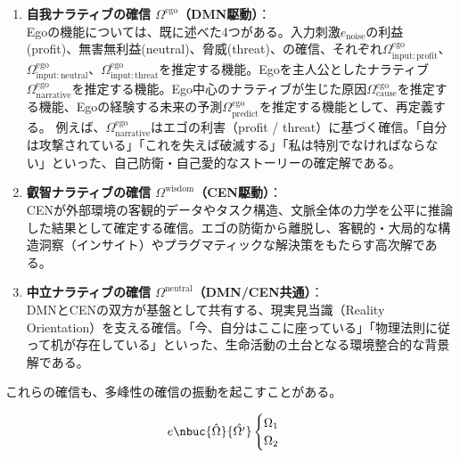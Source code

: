 \begin{enumerate}[label=(\roman*)]
  \item \textbf{自我ナラティブの確信 $\Omega^{\mathrm{ego}}$（DMN駆動）}：\\
      Egoの機能については、既に述べた4つがある。入力刺激$e_{\mathrm{noise}}$の利益(profit)、無害無利益(neutral)、脅威(threat)、の確信、それぞれ$\Omega^{\mathrm{ego}}_{\mathrm{input:profit}}$、$\Omega^{\mathrm{ego}}_{\mathrm{input:neutral}}$、$\Omega^{\mathrm{ego}}_{\mathrm{input:threat}}$を推定する機能。Egoを主人公としたナラティブ$\Omega^{\mathrm{ego}}_{\mathrm{narrative}}$を推定する機能。Ego中心のナラティブが生じた原因$\Omega^{\mathrm{ego}}_{\mathrm{cause}}$を推定する機能、Egoの経験する未来の予測$\Omega^{\mathrm{ego}}_{\mathrm{predict}}$を推定する機能として、再定義する。
  例えば、$\Omega^{\mathrm{ego}}_{\mathrm{narrative}}$はエゴの利害（profit / threat）に基づく確信。「自分は攻撃されている」「これを失えば破滅する」「私は特別でなければならない」といった、自己防衛・自己愛的なストーリーの確定解である。
  \item \textbf{叡智ナラティブの確信 $\Omega^{\mathrm{wisdom}}$（CEN駆動）}：\\
  CENが外部環境の客観的データやタスク構造、文脈全体の力学を公平に推論した結果として確定する確信。エゴの防衛から離脱し、客観的・大局的な構造洞察（インサイト）やプラグマティックな解決策をもたらす高次解である。
  \item \textbf{中立ナラティブの確信 $\Omega^{\mathrm{neutral}}$（DMN/CEN共通）}：\\
  DMNとCENの双方が基盤として共有する、現実見当識（Reality Orientation）を支える確信。「今、自分はここに座っている」「物理法則に従って机が存在している」といった、生命活動の土台となる環境整合的な背景解である。
\end{enumerate}

これらの確信も、多峰性の確信の振動を起こすことがある。

\begin{equation}
    e \nbuc{\hat{\Omega}}{\hat{\Omega'}} 
    \begin{cases}
        \Omega_1 \\
        \Omega_2
    \end{cases}
\end{equation}

